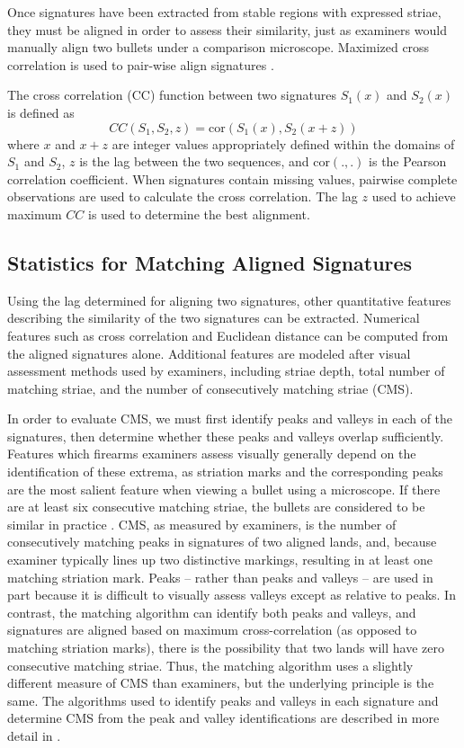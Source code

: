 \documentclass[doubleblind]{elsarticle}\usepackage[]{graphicx}\usepackage[]{color}
\begin{document}
Once signatures have been extracted from stable regions with expressed striae, they must be aligned in order to assess their similarity, just as examiners would manually align two bullets under a comparison microscope. Maximized cross correlation is used to pair-wise align signatures \citep{aoas2,vorburgerApplicationsCrosscorrelationFunctions2011}. 

The cross correlation (CC) function between two signatures $S_1(x)$ and $S_2(x)$ is defined as 
\[
CC(S_1, S_2, z) = \text{cor}\left(S_1(x), S_2(x + z)\right)
\] 
where $x$ and $x+z$ are integer values appropriately defined within the domains of $S_1$ and $S_2$, $z$ is the lag between the two sequences, and $\text{cor}(.,.)$ is the Pearson correlation coefficient.
When signatures contain missing values, pairwise complete observations are used to calculate the cross correlation. The lag $z$ used to achieve maximum $CC$ is used to determine the best alignment.


\subsection{Statistics for Matching Aligned Signatures}

Using the lag determined for aligning two signatures, other quantitative features describing the similarity of the two signatures can be extracted. Numerical features such as cross correlation and Euclidean distance can be computed from the aligned signatures alone. Additional features are modeled after visual assessment methods used by examiners, including striae depth, total number of matching striae, and the number of consecutively matching striae (CMS).

In order to evaluate CMS, we must first identify peaks and valleys in each of the signatures, then determine whether these peaks and valleys overlap sufficiently. Features which firearms examiners assess visually generally depend on the identification of these extrema, as striation marks and the corresponding peaks are the most salient feature when viewing a bullet using a microscope. If there are at least six consecutive matching striae, the bullets are considered to be similar in practice \citep{biasotti_firearms_1997,nichols_scientific_2006}. CMS, as measured by examiners, is the number of consecutively matching peaks in signatures of two aligned lands, and, because examiner typically lines up two distinctive markings, resulting in at least one matching striation mark. Peaks -- rather than peaks and valleys -- are used in part because it is difficult to visually assess valleys except as relative to peaks. In contrast, the matching algorithm can identify both peaks and valleys, and signatures are aligned based on maximum cross-correlation (as opposed to matching striation marks), there is the possibility that two lands will have zero consecutive matching striae. Thus, the matching algorithm uses a slightly different measure of CMS than examiners, but the underlying principle is the same. The algorithms used to identify peaks and valleys in each signature and determine CMS from the peak and valley identifications are described in more detail in \citep[p. 2340, step 3 -- 4]{aoas2}. 
\end{document}

